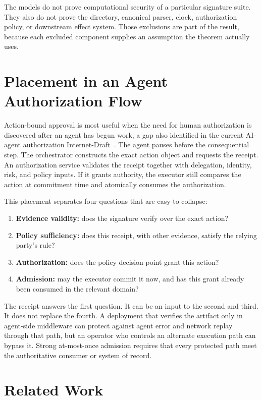 \documentclass[10.5pt]{article}
\begin{document}
The models do not prove computational security of a particular signature suite.
They also do not prove the directory, canonical parser, clock, authorization
policy, or downstream effect system. Those exclusions are part of the result,
because each excluded component supplies an assumption the theorem actually uses.

\section{Placement in an Agent Authorization Flow}

Action-bound approval is most useful when the need for human authorization is
discovered after an agent has begun work, a gap also identified in the current
AI-agent authorization Internet-Draft~\cite{klrc}. The agent pauses before the
consequential step. The orchestrator constructs the exact action object and
requests the receipt. An authorization service validates the receipt together
with delegation, identity, risk, and policy inputs. If it grants authority, the
executor still compares the action at commitment time and atomically consumes the
authorization.

This placement separates four questions that are easy to collapse:

\begin{enumerate}[leftmargin=*]
\item \textbf{Evidence validity:} does the signature verify over the exact action?
\item \textbf{Policy sufficiency:} does this receipt, with other evidence, satisfy
the relying party's rule?
\item \textbf{Authorization:} does the policy decision point grant this action?
\item \textbf{Admission:} may the executor commit it now, and has this grant
already been consumed in the relevant domain?
\end{enumerate}

The receipt answers the first question. It can be an input to the second and
third. It does not replace the fourth. A deployment that verifies the artifact
only in agent-side middleware can protect against agent error and network replay
through that path, but an operator who controls an alternate execution path can
bypass it. Strong at-most-once admission requires that every protected path meet
the authoritative consumer or system of record.

\section{Related Work}
\end{document}
